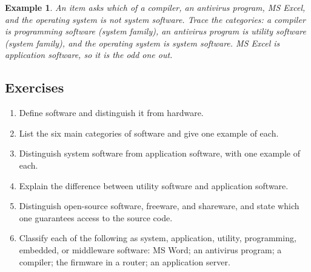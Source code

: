 \documentclass[11pt]{article}
\newtheorem{example}{Example}[section]
\begin{document}
\begin{example}
An item asks which of a compiler, an antivirus program, MS Excel, and the
operating system is \emph{not} system software. Trace the categories: a
compiler is programming software (system family), an antivirus program is
utility software (system family), and the operating system is system software.
MS Excel is application software, so it is the odd one out.
\end{example}

\subsection*{Exercises}
\begin{enumerate}[label=\arabic*.]
  \item Define software and distinguish it from hardware.
  \item List the six main categories of software and give one example of each.
  \item Distinguish system software from application software, with one
    example of each.
  \item Explain the difference between utility software and application
    software.
  \item Distinguish open-source software, freeware, and shareware, and state
    which one guarantees access to the source code.
  \item Classify each of the following as system, application, utility,
    programming, embedded, or middleware software: MS Word; an antivirus
    program; a compiler; the firmware in a router; an application server.
\end{enumerate}
\end{document}
